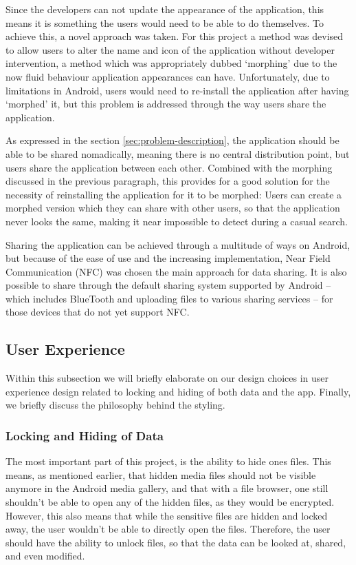 Since the developers can not update the appearance of the application, this means it is something the users would need to be able to do themselves.
To achieve this, a novel approach was taken.
For this project a method was devised to allow users to alter the name and icon of the application without developer intervention, a method which was appropriately dubbed `morphing' due to the now fluid behaviour application appearances can have.
Unfortunately, due to limitations in Android, users would need to re-install the application after having `morphed' it, but this problem is addressed through the way users share the application.

As expressed in the section \ref{sec:problem-description}, the application should be able to be shared nomadically, meaning there is no central distribution point, but users share the application between each other. 
Combined with the morphing discussed in the previous paragraph, this provides for a good solution for the necessity of reinstalling the application for it to be morphed: 
Users can create a morphed version which they can share with other users, so that the application never looks the same, making it near impossible to detect during a casual search.

Sharing the application can be achieved through a multitude of ways on Android, but because of the ease of use and the increasing implementation, Near Field Communication (NFC)\cite{website:nfc-spec} was chosen the main approach for data sharing. 
It is also possible to share through the default sharing system supported by Android -- which includes BlueTooth and uploading files to various sharing services -- for those devices that do not yet support NFC.

\subsection{User Experience}
\label{sec:approach-and-design:user-experience}

Within this subsection we will briefly elaborate on our design
choices in user experience design related to locking and hiding
of both data and the app. Finally, we briefly discuss the 
philosophy behind the styling. 

\subsubsection{Locking and Hiding of Data}

The most important part of this project, is the ability to hide
ones files. This means, as mentioned earlier, that hidden media
files should not be visible anymore in the Android media
gallery, and that with a file browser, one still shouldn't be
able to open any of the hidden files, as they would be
encrypted. However, this also means that while the sensitive
files are hidden and locked away, the user wouldn't be able to
directly open the files. Therefore, the user should have the
ability to unlock files, so that the data can be looked at,
shared, and even modified.

